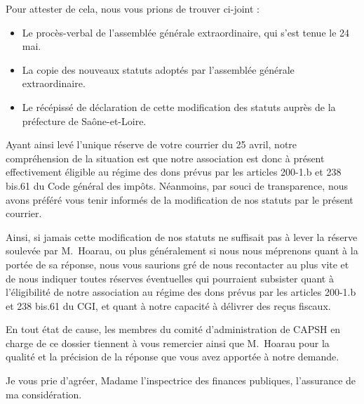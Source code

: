 \documentclass[11pt]{lettre}
\begin{document}
\begin{letter}
Pour attester de cela, nous vous prions de trouver ci-joint :
\nopagebreak
  \begin{itemize}
    \item Le procès-verbal de l'assemblée générale extraordinaire, qui s'est
      tenue le 24 mai.
    \item La copie des nouveaux statuts adoptés par l'assemblée générale
      extraordinaire.
    \item Le récépissé de déclaration de cette modification des statuts auprès
      de la préfecture de Saône-et-Loire.
  \end{itemize}

Ayant ainsi levé l'unique réserve de votre courrier du 25 avril, notre
  compréhension de la situation est que notre association est donc à présent
  effectivement éligible au régime des dons prévus par les articles 200-1.b et
  238 bis.61 du Code général des impôts. Néanmoins, par souci de transparence,
  nous avons préféré vous tenir informés de la modification de nos statuts par
  le présent courrier.
  
Ainsi, si jamais cette modification de nos statuts ne suffisait pas à lever la
réserve soulevée par M.\ Hoarau, ou plus généralement si nous nous méprenons
quant à la portée de sa réponse, nous vous saurions gré de nous recontacter au
plus vite et de nous indiquer toutes réserves éventuelles qui pourraient
subsister quant à l'éligibilité de notre association au régime des dons prévus
par les articles 200-1.b et 238 bis.61 du CGI, et quant à notre capacité à
délivrer des reçus fiscaux.

En tout état de cause, les membres du comité d'administration de CAPSH en charge
de ce dossier tiennent à vous remercier ainsi que M.\ Hoarau pour la qualité et
la précision de la réponse que vous avez apportée à notre demande.

Je vous prie d'agréer, Madame l'inspectrice des finances publiques, l'assurance
de ma considération.

\vspace{2cm}

\hspace{10cm}\begin{minipage}{6cm}
\end{minipage}

\thispagestyle{empty}
\end{letter}
\end{document}
